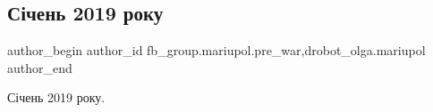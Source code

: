  
 
 
 
 

\subsection{Січень 2019 року}
\label{sec:23_03_2023.fb.fb_group.mariupol.pre_war.1.s_chen_2019_roku}
 
\ifcmt
 author_begin
   author_id fb_group.mariupol.pre_war,drobot_olga.mariupol
 author_end
\fi

Січень 2019 року.

